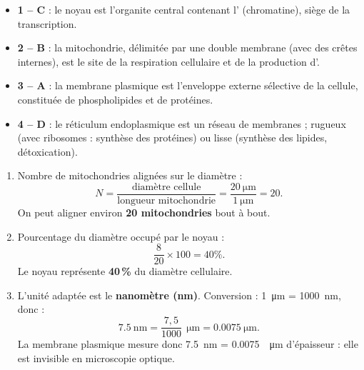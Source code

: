 \documentclass[11pt]{article}
\begin{document}
\begin{corrige}
\begin{itemize}
    \item \textbf{1 -- C} : le noyau est l'organite central contenant l' (chromatine), siège de la transcription.
    \item \textbf{2 -- B} : la mitochondrie, délimitée par une double membrane (avec des crêtes internes), est le site de la respiration cellulaire et de la production d'.
    \item \textbf{3 -- A} : la membrane plasmique est l'enveloppe externe sélective de la cellule, constituée de phospholipides et de protéines.
    \item \textbf{4 -- D} : le réticulum endoplasmique est un réseau de membranes ; rugueux (avec ribosomes : synthèse des protéines) ou lisse (synthèse des lipides, détoxication).
\end{itemize}
\end{corrige}

\begin{corrige}
\begin{enumerate}
    \item Nombre de mitochondries alignées sur le diamètre :
    \[ N = \frac{\text{diamètre cellule}}{\text{longueur mitochondrie}} = \frac{\SI{20}{\micro\meter}}{\SI{1}{\micro\meter}} = 20. \]
    On peut aligner environ \textbf{20 mitochondries} bout à bout.
    \item Pourcentage du diamètre occupé par le noyau :
    \[ \frac{8}{20} \times 100 = 40 \%. \]
    Le noyau représente \textbf{40\,\%} du diamètre cellulaire.
    \item L'unité adaptée est le \textbf{nanomètre (nm)}. Conversion : \SI{1}{\micro\meter} = \SI{1000}{\nano\meter}, donc :
    \[ \SI{7,5}{\nano\meter} = \frac{7,5}{1000}\ \SI{}{\micro\meter} = \SI{0,0075}{\micro\meter}. \]
    La membrane plasmique mesure donc \SI{7,5}{\nano\meter} = \num{0,0075}\ \SI{}{\micro\meter} d'épaisseur : elle est invisible en microscopie optique.
\end{enumerate}
\end{corrige}
\end{document}
